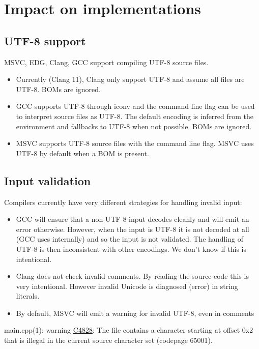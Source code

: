 \documentclass{wg21}
\begin{document}
\section{Impact on implementations}

\subsection{UTF-8 support}
MSVC, EDG, Clang, GCC support compiling UTF-8 source files.

\begin{itemize}
\item Currently (Clang 11), Clang only support UTF-8 and assume all files are UTF-8. BOMs are ignored.
\item GCC supports UTF-8 through iconv and the command line flag  can be used to interpret source files as UTF-8.
The default encoding is inferred from the environment and fallbacks to UTF-8 when not possible. BOMs are ignored.
\item MSVC supports UTF-8 source files with the  command line flag. MSVC uses UTF-8 by default when a BOM is present.
\end{itemize}


\subsection{Input validation}

Compilers currently have very different strategies for handling invalid input:

\begin{itemize}
\item GCC will ensure that a non-UTF-8 input decodes cleanly and will emit an error otherwise. However, when the input is UTF-8 it is
not decoded at all (GCC uses internally) and so the input is not validated. The handling of UTF-8 is then inconsistent with other encodings.
We don't know if this is intentional.
\item Clang does not check invalid comments. By reading the source code this is very intentional. However invalid Unicode is diagnosed (error) in string literals.
\item By default, MSVC will emit a warning for invalid UTF-8, even in comments
\end{itemize}

\begin{quoteblock}
main.cpp(1): warning \href{https://docs.microsoft.com/en-us/cpp/error-messages/compiler-warnings/compiler-warnings-by-compiler-version?view=msvc-160#warnings-introduced-in-visual-studio-2015-update-2-compiler-version-1900239180}{C4828}: The file contains a character starting at offset 0x2 that is illegal in the current source character set (codepage 65001).
\end{quoteblock}
\end{document}
